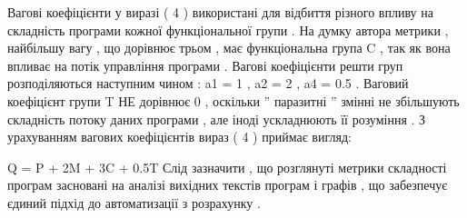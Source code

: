 \begin{description}
Вагові коефіцієнти у виразі ( 4 ) використані для відбиття різного впливу на складність програми кожної функціональної групи . На думку автора метрики , найбільшу вагу , що дорівнює трьом , має функціональна група C , так як вона впливає на потік управління програми . Вагові коефіцієнти решти груп розподіляються наступним чином : a1 = 1 , a2 = 2 , a4 = 0.5 . Ваговий коефіцієнт групи T НЕ дорівнює 0 , оскільки '' паразитні '' змінні не збільшують складність потоку даних програми , але іноді ускладнюють її розуміння . З урахуванням вагових коефіцієнтів вираз ( 4 ) приймає вигляд:

Q = P + 2M + 3C + 0.5T
Слід зазначити , що розглянуті метрики складності програм засновані на аналізі вихідних текстів програм і графів , що забезпечує єдиний підхід до автоматизації з розрахунку .

\end{description}


